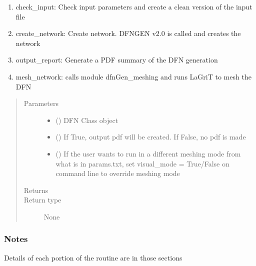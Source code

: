 \documentclass[letterpaper,10pt,english]{sphinxmanual}
\begin{document}
\begin{fulllineitems}
\begin{fulllineitems}
\begin{description}
\begin{enumerate}
\item {} 
check\_input: Check input parameters and create a clean version of the input file

\item {} 
create\_network: Create network. DFNGEN v2.0 is called and creates the network

\item {} 
output\_report: Generate a PDF summary of the DFN generation

\item {} 
mesh\_network: calls module dfnGen\_meshing and runs LaGriT to mesh the DFN

\end{enumerate}

\end{description}
\begin{quote}\begin{description}
\item[{Parameters}] \leavevmode\begin{itemize}
\item {} 
 () \textendash{} DFN Class object

\item {} 
 () \textendash{} If True, output pdf will be created. If False, no pdf is made

\item {} 
 () \textendash{} If the user wants to run in a different meshing mode from what is in params.txt, set visual\_mode = True/False on command line to override meshing mode

\end{itemize}

\item[{Returns}] \leavevmode


\item[{Return type}] \leavevmode
None

\end{description}\end{quote}
\subsubsection*{Notes}

Details of each portion of the routine are in those sections


\end{fulllineitems}
\end{fulllineitems}
\end{document}

